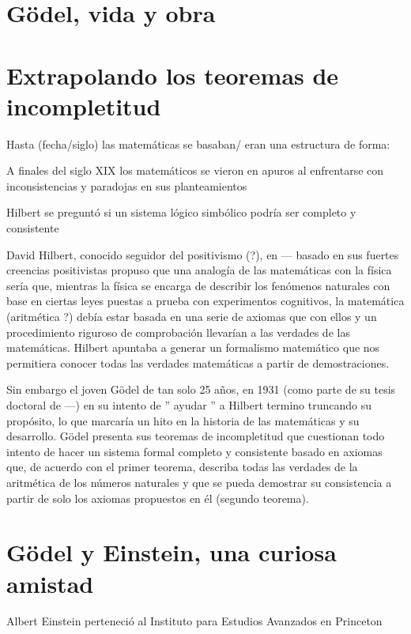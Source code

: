 \documentclass[11pt]{book}
\begin{document}
 \section{Gödel, vida y obra}
 
 \section{Extrapolando los teoremas de incompletitud}

Hasta (fecha/siglo) las matemáticas se basaban/ eran una estructura de forma:

A finales del siglo XIX los matemáticos se vieron en apuros al enfrentarse con inconsistencias y paradojas en sus planteamientos 

Hilbert se preguntó si un sistema lógico simbólico podría ser completo y consistente

David Hilbert, conocido seguidor del positivismo (?), en --- basado en sus fuertes creencias positivistas propuso que una analogía de las matemáticas con la física sería que, mientras la física se encarga de describir los fenómenos naturales con base en ciertas leyes puestas a prueba con experimentos cognitivos, la matemática (aritmética ?) debía estar basada en una serie de axiomas que con ellos y un procedimiento riguroso de comprobación llevarían a las verdades de las matemáticas. Hilbert apuntaba a generar un formalismo matemático que nos permitiera conocer todas las verdades matemáticas a partir de demostraciones.


Sin embargo el joven Gödel de tan solo 25 años, en 1931 (como parte de su tesis doctoral de ---) en su intento de '' ayudar '' a Hilbert termino truncando su propósito, lo que marcaría un hito en la historia de las matemáticas y su desarrollo. Gödel presenta sus teoremas de incompletitud que cuestionan todo intento de hacer un sistema formal completo y consistente basado en axiomas que, de acuerdo con el primer teorema, describa todas las verdades de la aritmética de los números naturales y que se pueda demostrar su consistencia a partir de solo los axiomas propuestos en él (segundo teorema).

\section{Gödel y Einstein, una curiosa amistad}
Albert Einstein perteneció al Instituto para Estudios Avanzados en Princeton   
\end{document}
